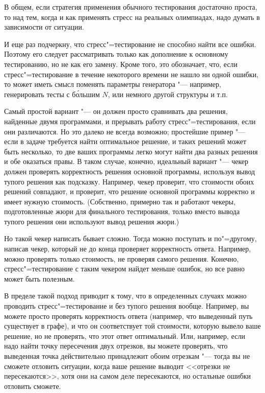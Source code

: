 \documentclass[a4paper,10pt]{problems}
\begin{document}
В общем, если стратегия применения обычного тестирования достаточно проста, то над тем, когда и как применять стресс на реальных олимпиадах,
надо думать в зависимости от ситуации.

И еще раз подчеркну, что стресс"=тестирование не способно найти все ошибки. 
Поэтому его следует рассматривать только как дополнение к основному тестированию, но не как его замену.
Кроме того, это обозначает, что, если стресс"=тестирование в течение некоторого времени не нашло ни одной ошибки,
то может иметь смысл поменять параметры генератора "--- например, генерировать тесты с б\'{о}льшим $N$, или немного другой структуры и т.п.

Самый простой вариант "--- он должен просто сравнивать два решения, найденные двумя программами, и прерывать работу стресс"=тестирования,
если они различаются.
Но это далеко не всегда возможно; простейшие пример "--- если в задаче требуется найти оптимальное решение, и таких решений может быть несколько,
то две ваших программы легко могут найти два разных решения и обе оказаться правы.
В таком случае, конечно, идеальный вариант "--- чекер должен проверять корректность решения основной программы, используя вывод тупого решения как подсказку. 
Например, чекер проверит, что стоимости обоих решений совпадают, и проверит, что решение основной программы корректно и имеет нужную стоимость.
(Собственно, примерно так и работают чекеры, подготовленные жюри для финального тестирования, только вместо вывода тупого решения они используют
вывод решения жюри.)

Но такой чекер написать бывает сложно. Тогда можно поступать и по"=другому, написав чекер, который не до конца проверяет корректность ответа.
Например, можно проверять только стоимость, не проверяя самого решения.
Конечно, стресс"=тестирование с таким чекером найдет меньше ошибок, но все равно может быть полезным.

В пределе такой подход приводит к тому, что в определенных случаях можно проводить стресс"=тестирование и без тупого решения вообще.
Например, вы можете просто проверять корректность ответа (например, что выведенный путь существует в графе), и что он соответствует той стоимости,
которую вывело ваше решение, но не проверять, что этот ответ оптимальный. 
Или, например, если надо найти точку пересечения двух отрезков, вы можете проверять, что выведенная точка действительно принадлежит
обоим отрезкам "--- тогда вы не сможете отловить ситуации, когда ваше решение выводит <<отрезки не пересекаются>>, хотя они на самом деле пересекаются,
но остальные ошибки отловить сможете.
\end{document}
